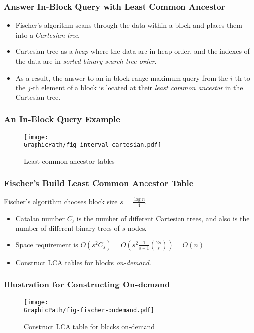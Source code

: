 \begin{frame}
	\frametitle{Answer In-Block Query with Least Common Ancestor}
	\begin{itemize}
		\setlength\itemsep{1em}
		\item
			Fischer's algorithm scans through the data within a block
			and places them into a {\em Cartesian tree}.
		\item
			Cartesian tree as a {\em heap} where the data are in heap
			order, and the indexes of the data are in {\em sorted binary
			search tree order}.
		\item 
			As a result, the answer to an in-block range maximum query
			from the $i$-th to the $j$-th element of a block is located
			at their {\em least common ancestor} in the Cartesian tree.
	\end{itemize}
\end{frame}

\begin{frame}
	\frametitle{An In-Block Query Example}
	\begin{figure}[htbp]   
	  \centering
	  \texttt{[image: \\GraphicPath/fig-interval-cartesian.pdf]}
	  \caption{Least common ancestor tables}
	  \label{fig:ancesstor-cartesian}
	\end{figure}
\end{frame}

\begin{frame}
	\frametitle{Fischer's Build Least Common Ancestor Table}
	Fischer's algorithm chooses block size $s=\frac{\log n}{4}$.
	\begin{itemize}
		\setlength\itemsep{1em}
		\item 
			Catalan number $C_s$ is the number of different Cartesian
			trees, and also is the number of different binary trees of
			$s$ nodes.
		\item
			Space requirement is
			$O(s^2C_s)=O(s^2\frac{1}{s+1}\binom{2s}{s})=O(n)$
		\item
			Construct LCA tables for blocks {\em on-demand}.
	\end{itemize}
\end{frame}

\begin{withoutheadline}
\begin{frame}
	\frametitle{Illustration for Constructing On-demand}
	\begin{figure}[htbp]   
	  \centering
	  \texttt{[image: \\GraphicPath/fig-fischer-ondemand.pdf]}
	  \caption{Construct LCA table for blocks on-demand}
	  \label{fig:ancesstor-cartesian}
	\end{figure}
\end{frame}
\end{withoutheadline}


